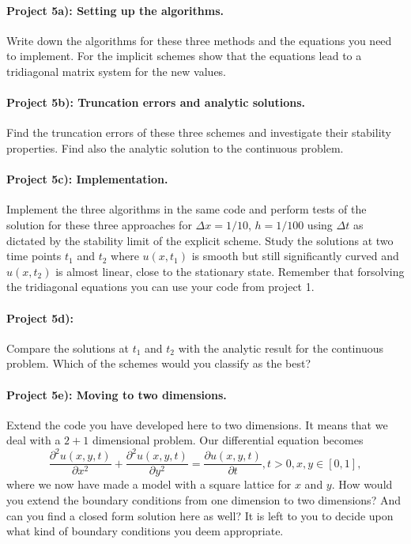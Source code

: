 \documentclass[%
oneside,                 %
final,                   %
10pt]{article}
\begin{document}
\paragraph{Project 5a): Setting up the algorithms.}
Write down the algorithms for these three methods and the equations you need to implement.
For the implicit schemes show that the equations lead to a tridiagonal matrix system for the new values.

\paragraph{Project 5b): Truncation errors and analytic solutions.}
Find the truncation errors of these three schemes and investigate their stability properties.
Find also the analytic solution to the continuous problem. 

\paragraph{Project 5c): Implementation.}
Implement the three algorithms in the same code and perform tests of the solution 
for these three approaches
for $\Delta x=1/10$, $h=1/100$ using  $\Delta t$ as dictated by the stability limit of the explicit scheme.
Study the solutions at two time points $t_1$ and $t_2$ where $u(x,t_1)$ is smooth but still significantly curved
and $u(x,t_2)$ is almost linear, close to the stationary state.
Remember that forsolving the tridiagonal equations you can use your code from project 1.  
\paragraph{Project 5d):}
Compare the solutions at $t_1$ and $t_2$ with the analytic result for the continuous problem.
Which of the schemes would you classify as the best?

\paragraph{Project 5e): Moving to two dimensions.}
Extend the code you have developed here to two
  dimensions. 
It means that we deal with a $2+1$ dimensional problem. Our differential equation becomes
\[
 \frac{\partial^2 u(x,y,t)}{\partial x^2}+\frac{\partial^2 u(x,y,t)}{\partial y^2} =\frac{\partial u(x,y,t)}{\partial t}, t> 0, x,y\in [0,1],
\]
where we now have made a model with a square lattice for $x$ and $y$. 
How would you extend the boundary conditions from one dimension to two dimensions? And can you
  find a closed form solution here as well?  It is left to you to decide upon what kind of boundary conditions
you deem appropriate.
\end{document}
